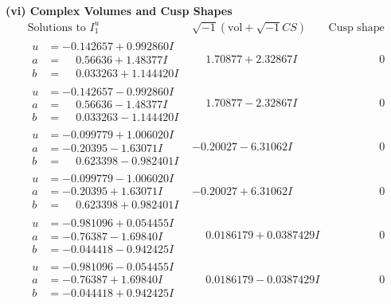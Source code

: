 \documentclass[1p]{elsarticle_modified}
\theoremstyle{definition}
\newcommand{\I}{\sqrt{-1}}
\begin{document}
\newpage\flushleft \textbf{(vi) Complex Volumes and Cusp Shapes}
$$\begin{array}{c|c|c}  
\text{Solutions to }I^u_{1}& \I (\text{vol} + \sqrt{-1}CS) & \text{Cusp shape}\\
 \hline 
\begin{aligned}
u &= -0.142657 + 0.992860 I \\
a &= \phantom{-}0.56636 + 1.48377 I \\
b &= \phantom{-}0.033263 + 1.144420 I\end{aligned}
 & \phantom{-}1.70877 + 2.32867 I & \phantom{-0.000000 } 0 \\ \hline\begin{aligned}
u &= -0.142657 - 0.992860 I \\
a &= \phantom{-}0.56636 - 1.48377 I \\
b &= \phantom{-}0.033263 - 1.144420 I\end{aligned}
 & \phantom{-}1.70877 - 2.32867 I & \phantom{-0.000000 } 0 \\ \hline\begin{aligned}
u &= -0.099779 + 1.006020 I \\
a &= -0.20395 - 1.63071 I \\
b &= \phantom{-}0.623398 - 0.982401 I\end{aligned}
 & -0.20027 - 6.31062 I & \phantom{-0.000000 } 0 \\ \hline\begin{aligned}
u &= -0.099779 - 1.006020 I \\
a &= -0.20395 + 1.63071 I \\
b &= \phantom{-}0.623398 + 0.982401 I\end{aligned}
 & -0.20027 + 6.31062 I & \phantom{-0.000000 } 0 \\ \hline\begin{aligned}
u &= -0.981096 + 0.054455 I \\
a &= -0.76387 - 1.69840 I \\
b &= -0.044418 - 0.942425 I\end{aligned}
 & \phantom{-}0.0186179 + 0.0387429 I & \phantom{-0.000000 } 0 \\ \hline\begin{aligned}
u &= -0.981096 - 0.054455 I \\
a &= -0.76387 + 1.69840 I \\
b &= -0.044418 + 0.942425 I\end{aligned}
 & \phantom{-}0.0186179 - 0.0387429 I & \phantom{-0.000000 } 0 \\ \hline\begin{aligned}

\end{aligned}
\end{array}$$
\end{document}
